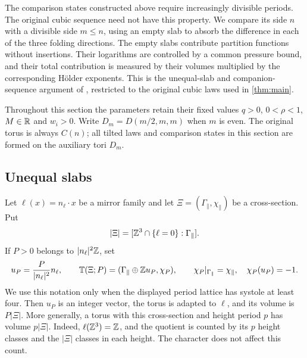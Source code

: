 The comparison states constructed above require increasingly divisible
periods. The original cubic sequence need not have this property.
We compare its side $n$ with a divisible side $m\le n$, using an
empty slab to absorb the difference in each of the three folding
directions. The empty slabs contribute partition functions without
insertions. Their logarithms are controlled by a common pressure
bound, and their total contribution is measured by their volumes
multiplied by the corresponding H\"older exponents. This is the
unequal-slab and companion-sequence argument of
\cite[Sections~11.1--11.5]{ChamberQED}, restricted to the original
cubic laws used in \cref{thm:main}.

Throughout this section the parameters retain their fixed values
$q>0$, $0<\rho<1$, $M\in\mathbb R$ and $w_i>0$. Write
$D_m=D(m/2,m,m)$ when $m$ is even. The original torus is always
$C(n)$; all tilted laws and comparison states in this section are
formed on the auxiliary tori $D_m$.

\subsection{Unequal slabs}\label{sec:unequal-heights}

Let $\ell(x)=n_\ell\cdot x$ be a mirror family and let
$\Xi=(\Gamma_\parallel,\chi_\parallel)$ be a cross-section. Put
\[
 |\Xi|=[\mathbb Z^3\cap\{\ell=0\}:\Gamma_\parallel].
\]
If $P>0$ belongs to $|n_\ell|^2\mathbb Z$, set
\[
 u_P=\frac{P}{|n_\ell|^2}n_\ell,\qquad
 \mathbb T(\Xi;P)=
   (\Gamma_\parallel\oplus\mathbb Z u_P,\chi_P),
 \qquad \chi_P|_{\Gamma_\parallel}=\chi_\parallel,
 \quad\chi_P(u_P)=-1.
\]
We use this notation only when the displayed period lattice has systole
at least four. Then $u_P$ is an integer vector, the torus is adapted
to $\ell$, and its volume is $P|\Xi|$. More generally, a torus with
this cross-section and height period $p$ has volume $p|\Xi|$.
Indeed, $\ell(\mathbb Z^3)=\mathbb Z$, and the quotient is counted by its $p$
height classes and the $|\Xi|$ classes in each height. The character
does not affect this count.

